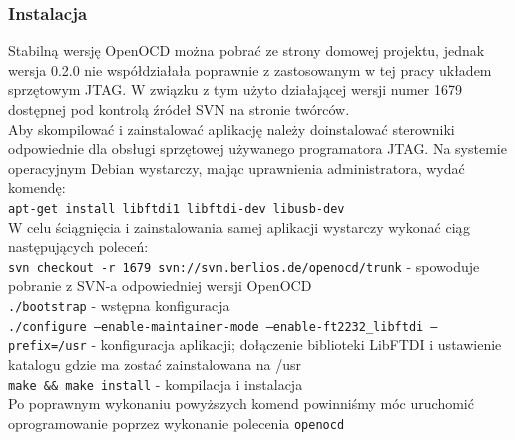 \documentclass[a4paper,12pt]{book}
\begin{document}
				\subsubsection{Instalacja}
					Stabilną wersję OpenOCD można pobrać ze strony domowej projektu, jednak wersja 0.2.0 nie współdziałała poprawnie z zastosowanym w tej pracy układem sprzętowym JTAG. W związku z tym użyto działającej wersji numer 1679 dostępnej pod kontrolą źródeł SVN na stronie twórców.\\
					Aby skompilować i zainstalować aplikację należy doinstalować sterowniki odpowiednie dla obsługi sprzętowej używanego programatora JTAG. Na systemie operacyjnym Debian wystarczy, mając uprawnienia administratora, wydać komendę:\\
					\texttt{apt-get install libftdi1 libftdi-dev libusb-dev}\\
					W celu ściągnięcia i zainstalowania samej aplikacji wystarczy wykonać ciąg następujących poleceń:\\
					\texttt{svn checkout -r 1679 svn://svn.berlios.de/openocd/trunk} - spowoduje pobranie z SVN-a odpowiedniej wersji OpenOCD\\
					\texttt{./bootstrap} - wstępna konfiguracja\\
					\texttt{./configure --enable-maintainer-mode --enable-ft2232\_libftdi --prefix=/usr} - konfiguracja aplikacji; dołączenie biblioteki LibFTDI i ustawienie katalogu gdzie ma zostać zainstalowana na /usr\\
					\texttt{make \&\& make install} - kompilacja i instalacja\\
					Po poprawnym wykonaniu powyższych komend powinniśmy móc uruchomić oprogramowanie poprzez wykonanie polecenia \texttt{openocd}
					
\end{document}
